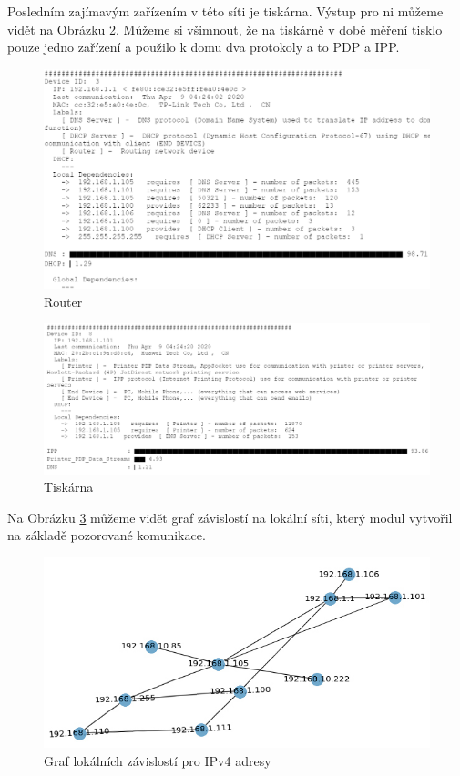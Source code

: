 \documentclass[thesis=B,czech,hidelinks]{FITthesis}[2019/03/21]
\begin{document}
    Posledním zajímavým zařízením v této síti je tiskárna. Výstup pro ni můžeme vidět na Obrázku \ref{PrinterHome}. Můžeme si všimnout, že na tiskárně v době měření tisklo pouze jedno zařízení a použilo k domu dva protokoly a to PDP a IPP. 
    \begin{figure}[h!]
        \centering
        \includegraphics[width=\textwidth]{Router_HomeNetwork.png}
        \caption[Ukázka měření: Router v domácí síti]{Router}
        \label{RouterHome}
    \end{figure}
    \begin{figure}[h!]
        \centering
        \includegraphics[width=\textwidth]{Printer_HomeNetwork.png}
        \caption[Ukázka měření: Tiskárna v domácí síti]{Tiskárna}
        \label{PrinterHome}
    \end{figure}
    
    Na Obrázku \ref{GrafHome} můžeme vidět graf závislostí na lokální síti, který modul vytvořil na základě pozorované komunikace.
    \begin{figure}[h!]
        \centering
        \includegraphics[width=\textwidth]{Graph_Local_IPv4_HomeNetwork.jpg}
        \caption[Ukázka měření: Graf lokálních závislostí v domácí síti]{Graf lokálních závislostí pro IPv4 adresy}
        \label{GrafHome}
    \end{figure}
    
\end{document}
